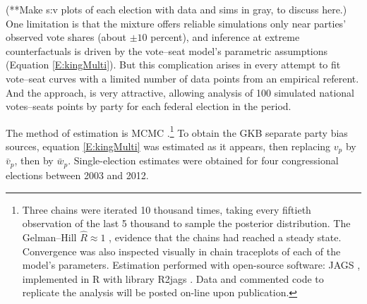 \documentclass[letter,12pt]{article}
\begin{document}
(**Make s:v plots of each election with data and sims in gray, to discuss here.) One limitation is that the mixture offers reliable simulations only near parties' observed vote shares (about $\pm10$ percent), and inference at extreme counterfactuals is driven by the vote--seat model's parametric assumptions (Equation \ref{E:kingMulti}). But this complication arises in every attempt to fit vote--seat curves with a limited number of data points from an empirical referent. And the approach, is very attractive, allowing analysis of 100 simulated national votes--seats points by party for each federal election in the period.  



The method of estimation is MCMC \citep{jackman.2000}.\footnote{Three chains were iterated 10 thousand times, taking every fiftieth observation of the last 5 thousand to sample the posterior distribution. The Gelman--Hill $\hat{R} \approx 1$ \citep{gelman.hill.2007}, evidence that the chains had reached a steady state. Convergence was also inspected visually in chain traceplots of each of the model's parameters. Estimation performed with open-source software: JAGS \citep{jags.cite}, implemented in R \citep{r.cite} with library R2jags \citep{r.r2jags}. Data and commented code to replicate the analysis will be posted on-line upon publication.} To obtain the GKB separate party bias sources, equation \ref{E:kingMulti} was estimated as it appears, then replacing $v_p$ by $\bar{v}_p$, then by $\bar{w}_p$. Single-election estimates were obtained for four congressional elections between 2003 and 2012. 
\end{document}
